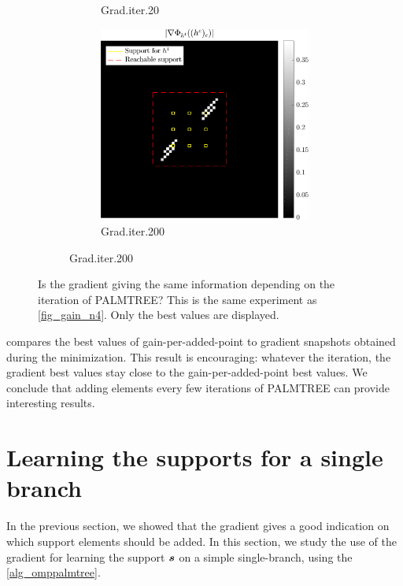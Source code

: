 \begin{figure}[!ht]
\begin{subfigure}[b]{0.49\linewidth}
\begin{subfigure}[b]{0.49\linewidth}
	\caption{Grad.\@ iter.\@ 20}
	\end{subfigure}
	\begin{subfigure}[b]{0.49\linewidth}\centering
	\includegraphics[width=\linewidth]{figures/xp_grad_iterations/xp_128x128_sc2_angl1_K3_S3_node4_iter200_partgrad4_bestvalues.pdf}
	\caption{Grad.\@ iter.\@ 200}
	\end{subfigure}
\end{subfigure}
\caption{Is the gradient giving the same information depending on the iteration of \ac{PALMTREE}? This is the same experiment as \cref{fig_gain_n4}. Only the best values are displayed.}\label{fig_iter_gain_vs_grad}
\end{figure}

\noindent
{} compares the best values of gain-per-added-point to gradient snapshots obtained during the minimization. This result is encouraging: whatever the iteration, the gradient best values stay close to the gain-per-added-point best values. We conclude that adding elements every few iterations of \ac{PALMTREE} can provide interesting results.

\FloatBarrier
\section{Learning the supports for a single branch}

In the previous section, we showed that the gradient gives a good indication on which support elements should be added. In this section, we study the use of the gradient for learning the support $\bm{s}$ on a simple single-branch, using the \cref{alg_omppalmtree}. 

